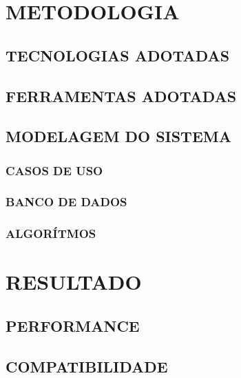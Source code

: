 \documentclass[12pt,a4paper]{article}
\begin{document}
	\newpage

	\section{METODOLOGIA}

		\subsection{TECNOLOGIAS ADOTADAS}

			\lipsum[1]

		\subsection{FERRAMENTAS ADOTADAS}

			\lipsum[1]

		\subsection{MODELAGEM DO SISTEMA}

			\lipsum[1]


			\subsubsection{CASOS DE USO}

				\lipsum[1]

			\subsubsection{BANCO DE DADOS}

				\lipsum[1]

			\subsubsection{ALGORÍTMOS}

				\lipsum[1]

	\section{RESULTADO}

		\lipsum[1]

		\subsection{PERFORMANCE}

			\lipsum[1]

		\subsection{COMPATIBILIDADE}
\end{document}
